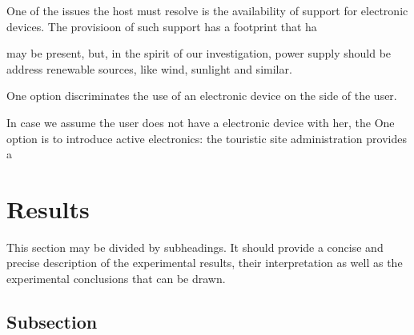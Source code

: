 \documentclass[sustainability,article,submit,pdftex,moreauthors]{Definitions/mdpi}
\begin{document}
One of the issues the host must resolve is the availability of support for electronic devices. The provisioon of such support has a footprint that ha

may be present, but, in the spirit of our investigation, power supply should be address renewable sources, like wind, sunlight and similar.



One option discriminates the use of an electronic device on the side of the user. 

In case we assume the user does not have a electronic device with her, the 
One option is to introduce active electronics: the touristic site administration provides a 





\section{Results}

This section may be divided by subheadings. It should provide a concise and precise description of the experimental results, their interpretation as well as the experimental conclusions that can be drawn.
\subsection{Subsection}
\end{document}
